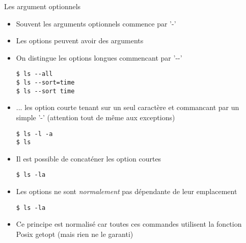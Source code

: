 \begin{frame}[fragile=singleslide]{Les argument optionnels}
  \begin{itemize}
  \item Souvent les arguments optionnels commence par '-'
  \item Les options peuvent avoir des arguments
  \item On distingue les options longues commencant par '-\--'
    \begin{lstlisting}
$ ls --all
$ ls --sort=time
$ ls --sort time
    \end{lstlisting}
  \item ... les option courte tenant sur un seul caractère et
    commancant par un simple '-' (attention tout de même aux
    exceptions)
    \begin{lstlisting}
$ ls -l -a
$ ls
    \end{lstlisting}
  \item Il est possible de concaténer les option courtes
    \begin{lstlisting}
$ ls -la
    \end{lstlisting} %
    \item Les options ne sont \emph{normalement} pas dépendante de leur emplacement
    \begin{lstlisting}
$ ls -la
    \end{lstlisting} %
  \item Ce principe est normalisé car toutes ces commandes utilisent
    la fonction Posix getopt (mais rien ne le garanti)
  \end{itemize}
\end{frame}

